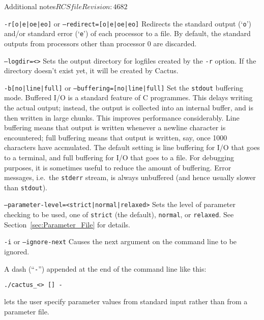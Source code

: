 \begin{cactuspart}{Additional notes}{$RCSfile$}{$Revision: 4682 $}
\begin{Lentry}
\item [\texttt{-r[o|e|oe|eo]} or \texttt{--redirect=[o|e|oe|eo]}]
Redirects the standard output (`\texttt{o}') and/or standard error
(`\texttt{e}') of each processor to a file.  By default,
the standard outputs from processors other than processor 0 are discarded.

\item [\texttt{--logdir=<\var{directory}>}]
Sets the output directory for logfiles created by the \texttt{-r} option.
If the directory doesn't exist yet, it will be created by Cactus.

\item [\texttt{-b[no|line|full]} or \texttt{--buffering=[no|line|full]}]
  Set the \texttt{stdout} buffering mode.  Buffered I/O is a
  standard feature of C programmes.  This delays writing the actual
  output; instead, the output is collected into an internal buffer,
  and is then written in large chunks.  This improves performance
  considerably.  Line buffering means that output is written whenever
  a newline character is encountered; full buffering means that output
  is written, say, once 1000 characters have accmulated.  The default
  setting is line buffering for I/O that goes to a terminal, and full
  buffering for I/O that goes to a file.  For debugging purposes, it
  is sometimes useful to reduce the amount of buffering.  Error
  messages, i.e.\ the \texttt{stderr} stream, is always unbuffered
  (and hence usually slower than \texttt{stdout}).

\item [\texttt{--parameter-level=<strict|normal|relaxed>}]
Sets the level of parameter checking to be used, one of \texttt{strict}
(the default), \texttt{normal}, or \texttt{relaxed}.
See Section~\ref{sec:Parameter_File} for details.

\item [\texttt{-i} or \texttt{--ignore-next}]
Causes the next argument on the command line to be ignored.
\end{Lentry}

A dash (``\texttt{-}'') appended at the end of the command line like this:

\texttt{./cactus\_<> [] -}

lets the user specify parameter values from standard input rather than
from a parameter file.



\end{cactuspart}
